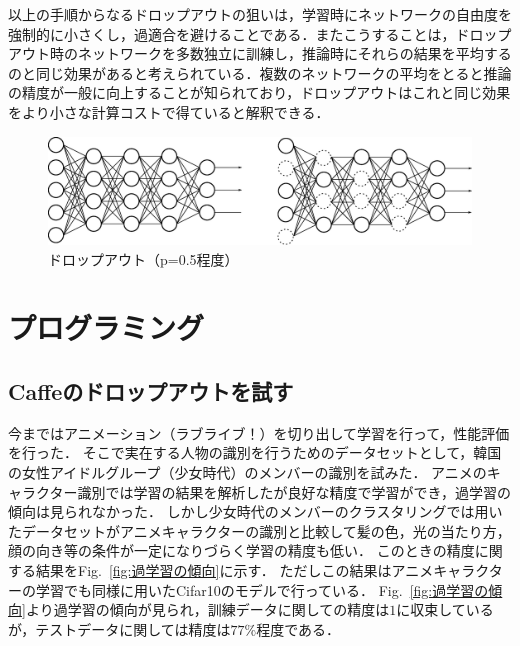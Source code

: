 \documentclass[a4paper,10pt]{jsarticle}
\begin{document}
以上の手順からなるドロップアウトの狙いは，学習時にネットワークの自由度を強制的に小さくし，過適合を避けることである．またこうすることは，ドロップアウト時のネットワークを多数独立に訓練し，推論時にそれらの結果を平均するのと同じ効果があると考えられている．複数のネットワークの平均をとると推論の精度が一般に向上することが知られており，ドロップアウトはこれと同じ効果をより小さな計算コストで得ていると解釈できる．

\begin{figure}[tb]
  \begin{center}
    \includegraphics[clip,width=12cm]{./fig/eps/dropout1.eps}
  \end{center}
  \caption{ドロップアウト（p=0.5程度）}
  \label{fig: ドロップアウト（p=0.5程度）}
\end{figure}


\section{プログラミング}
\subsection{Caffeのドロップアウトを試す}
今まではアニメーション（ラブライブ！）を切り出して学習を行って，性能評価を行った．
そこで実在する人物の識別を行うためのデータセットとして，韓国の女性アイドルグループ（少女時代）のメンバーの識別を試みた．
アニメのキャラクター識別では学習の結果を解析したが良好な精度で学習ができ，過学習の傾向は見られなかった．
しかし少女時代のメンバーのクラスタリングでは用いたデータセットがアニメキャラクターの識別と比較して髪の色，光の当たり方，顔の向き等の条件が一定になりづらく学習の精度も低い．
このときの精度に関する結果をFig.~\ref{fig:過学習の傾向}に示す．
ただしこの結果はアニメキャラクターの学習でも同様に用いたCifar10のモデルで行っている．
Fig.~\ref{fig:過学習の傾向}より過学習の傾向が見られ，訓練データに関しての精度は$1$に収束しているが，テストデータに関しては精度は$77\%$程度である．
\end{document}
